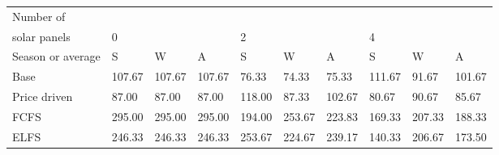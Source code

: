 \begin{table}[h] 
\centering 
\begin{tabular}{l|lll|lll|lll}Number of \\ solar panels&0& & &2& & &4& & \\ \hline 
Season or average & S & W & A & S & W & A & S & W & A \\ \hline 
Base&107.67&107.67&107.67&76.33&74.33&75.33&111.67&91.67&101.67 \\ 
Price driven&87.00&87.00&87.00&118.00&87.33&102.67&80.67&90.67&85.67 \\ 
FCFS&295.00&295.00&295.00&194.00&253.67&223.83&169.33&207.33&188.33 \\ 
ELFS&246.33&246.33&246.33&253.67&224.67&239.17&140.33&206.67&173.50 \\ 
\end{tabular} 
\end{table}